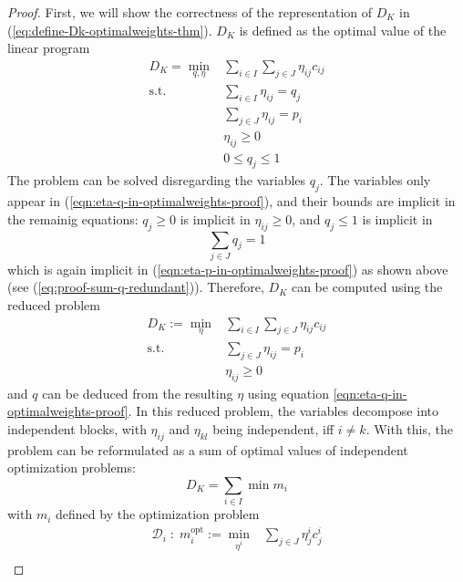 \begin{proof}
First, we will show the correctness of the representation of $D_K$ in (\ref{eq:define-Dk-optimalweights-thm}).
$D_K$ is defined as the optimal value of the linear program
\begin{subequations}
\begin{align}
  D_K = \min\limits_{q, \eta}& \sum_{i\in I}\sum_{j\in J}\eta_{ij}c_{ij}\\
  \text{s.t.}&\sum_{i\in I}\eta_{ij} = q_j\label{eqn:eta-q-in-optimalweights-proof}\\
  &\sum_{j\in J}\eta_{ij} = p_i\label{eqn:eta-p-in-optimalweights-proof}\\
  &\eta_{ij} \geq 0\\
  &0 \leq q_j \leq 1
\end{align}
\end{subequations}
The problem can be solved disregarding the variables $q_j$.
The variables only appear in (\ref{eqn:eta-q-in-optimalweights-proof}), and their bounds are implicit in the remainig equations: $q_j\geq 0$ is implicit in $\eta_{ij}\geq 0$, and $q_j\leq 1$ is implicit in
\[\sum_{j\in J}q_j=1\]
which is again implicit in (\ref{eqn:eta-p-in-optimalweights-proof}) as shown above (see (\ref{eq:proof-sum-q-redundant})).
Therefore, $D_K$ can be computed using the reduced problem
\begin{subequations}
\begin{align}
  D_K := \min\limits_{\eta}& \sum_{i\in I}\sum_{j\in J}\eta_{ij}c_{ij}\\
  \text{s.t.}&\sum_{j\in J}\eta_{ij} = p_i\\
  &\eta_{ij} \geq 0
\end{align}
\end{subequations}
and $q$ can be deduced from the resulting $\eta$ using equation \eqref{eqn:eta-q-in-optimalweights-proof}.
In this reduced problem, the variables decompose into independent blocks, with $\eta_{ij}$ and $\eta_{kl}$ being independent, iff $i\neq k$.
With this, the problem can be reformulated as a sum of optimal values of independent optimization problems:
\begin{equation}
  \label{eqn:Dk-decomposition-in-mi}
  D_K =  \sum_{i\in I} \min m_i
\end{equation}
with $m_i$ defined by the optimization problem
\begin{subequations}
\begin{align}
  \mathcal{D}_i\; :\; m_i^{\text{opt}} :=\min\limits_{\eta^i}&\sum_{j\in J}\eta_{j}^ic_{j}^i\\

\end{align}
\end{subequations}
\end{proof}
